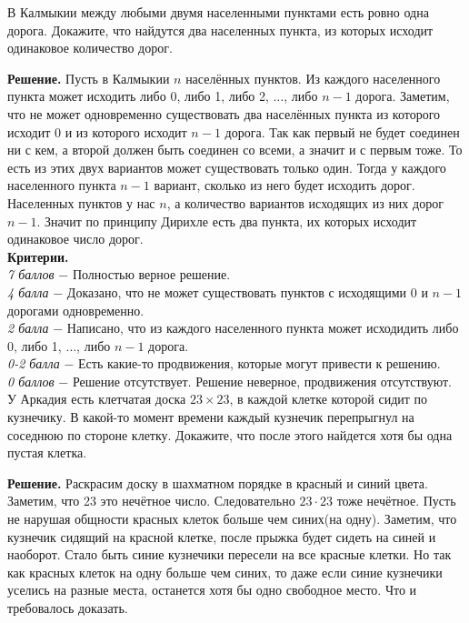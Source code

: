  В Калмыкии между любыми двумя населенными пунктами есть ровно одна дорога. Докажите, что найдутся два населенных пункта, из которых исходит одинаковое количество дорог. \par

\textbf{Решение.} Пусть в Калмыкии $n$ населённых пунктов. Из каждого населенного пункта может исходить либо 0, либо 1, либо 2, $\dotsc$, либо $n-1$ дорога. Заметим, что не может одновременно существовать два населённых пункта из которого исходит 0 и из которого исходит $n-1$ дорога. Так как первый не будет соединен ни с кем, а второй должен быть соединен со всеми, а значит и с первым тоже. То есть из этих двух вариантов может существовать только один. Тогда у каждого населенного пункта $n-1$ вариант, сколько из него будет исходить дорог. Населенных пунктов у нас $n$, а количество вариантов исходящих из них дорог $n-1$. Значит по принципу Дирихле есть два пункта, их которых исходит одинаковое число дорог. \\ 

\textbf{Критерии.} \\
\textit{7 баллов} $-$ Полностью верное решение. \\
\textit{4 балла} $-$ Доказано, что не может существовать пунктов с исходящими 0 и $n-1$ дорогами одновременно.\\ 
\textit{2 балла} $-$ Написано, что из каждого населенного пункта может исходидить либо 0, либо 1, $\dotsc$, либо $n-1$ дорога. \\
\textit{0-2 балла} $-$ Есть какие-то продвижения, которые могут привести к решению. \\ 
\textit{0 баллов} $-$ Решение отсутствует. Решение неверное, продвижения отсутствуют. \\ 

 У Аркадия есть клетчатая доска $23\times23$, в каждой клетке которой сидит по кузнечику. В какой-то момент времени каждый кузнечик перепрыгнул на соседнюю по стороне клетку. Докажите, что после этого найдется хотя бы одна пустая клетка.

\textbf{Решение.} Раскрасим доску в шахматном порядке в красный и синий цвета. Заметим, что 23 это нечётное число. Следовательно $23\cdot23$ тоже нечётное. Пусть не нарушая общности красных клеток больше чем синих(на одну). Заметим, что кузнечик сидящий на красной клетке, после прыжка будет сидеть на синей и наоборот. Стало быть синие кузнечики пересели на все красные клетки. Но так как красных клеток на одну больше чем синих, то даже если синие кузнечики уселись на разные места, останется хотя бы одно свободное место. Что и требовалось доказать. \\

